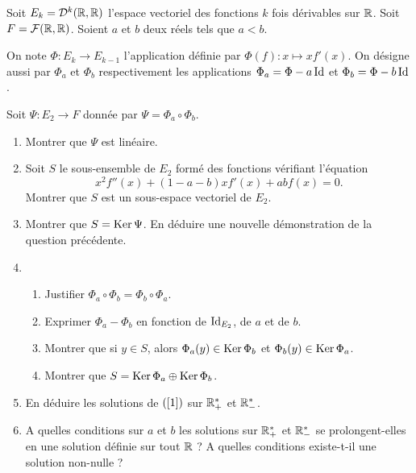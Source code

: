 Soit $E_k=\mathcal{D}^k(\mathbb{R},\mathbb{R})$ l'espace vectoriel des fonctions
$k$ fois dérivables sur $\mathbb{R}$. Soit $F=\mathcal{F}(\mathbb{R},\mathbb{R})$. Soient
$a$ et $b$ deux réels tels que $a<b$.
\par
On  note $\Phi: E_k \rightarrow E_{k-1}$ l'application définie par
$\Phi(f) : x \mapsto xf'(x)$. On désigne aussi par $\Phi_a$ et
$\Phi_b$ respectivement les applications $\Phi_a=\Phi-a\operatorname{Id}$ et
$\Phi_b=\Phi-b\operatorname{Id}$.
\par
Soit $\Psi : E_2 \rightarrow F$ donnée par $\Psi=\Phi_a \circ
\Phi_b$.
\begin{enumerate}
    \item Montrer que $\Psi$ est linéaire.
    \item Soit $S$ le sous-ensemble de $E_2$ formé des fonctions
    vérifiant l'équation \begin{equation}\label{1}
    x^2f''(x)+(1-a-b)xf'(x) +a b f(x) =0.
\end{equation}
    Montrer que $S$ est un sous-espace vectoriel de $E_2$.
    \item Montrer que $S = \operatorname{Ker} \Psi$. En déduire une nouvelle
    démonstration de la question précédente.
    \item \begin{enumerate}
        \item Justifier $\Phi_a \circ \Phi_b= \Phi_b \circ
        \Phi_a$.
        \item Exprimer $\Phi_a -\Phi_b$ en fonction de
        $\operatorname{Id}_{E_2}$, de $a$ et de $b$.
        \item Montrer que si $y \in S$, alors $\Phi_a(y) \in
        \operatorname{Ker} \Phi_b$ et $\Phi_b(y) \in \operatorname{Ker} \Phi_a$.
        \item Montrer que $S= \operatorname{Ker} \Phi_a \oplus \operatorname{Ker} \Phi_b$.
    \end{enumerate}
    \item En déduire les solutions de $(\ref{1})$ sur $\mathbb{R}^*_+$ et
    $\mathbb{R}^*_-$.
    \item A quelles conditions sur $a$ et $b$ les
    solutions sur $\mathbb{R}^*_+$ et $\mathbb{R}^*_-$ se prolongent-elles en une
    solution définie sur tout $\mathbb{R}$ ? A quelles conditions
    existe-t-il une solution non-nulle ?
\end{enumerate}




